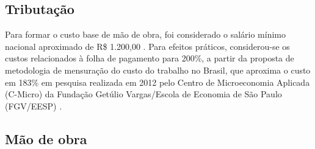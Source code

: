 \documentclass[
    12pt,               %
    openright,          %
    oneside,
    a4paper,            %
    BIBLATEX,           %
    TODO,               %
    english,            %
    brazil              %
    ]{ifsp-spo-inf-ctds}
\begin{document}
        \subsection{Tributação}
        

            Para formar o custo base de mão de obra, foi considerado o salário mínimo nacional aproximado de R\$ 1.200,00 \cite{Senado} . Para efeitos práticos, considerou-se os custos relacionados à folha de pagamento para 200\%, a partir da proposta de metodologia de mensuração do custo do trabalho no Brasil, que aproxima o custo em 183\% em pesquisa realizada em 2012 pelo Centro de Microeconomia Aplicada (C-Micro) da Fundação Getúlio Vargas/Escola de Economia de São Paulo (FGV/EESP) \cite{FGV}.
 
          
        \subsection{Mão de obra}
        

\end{document}
